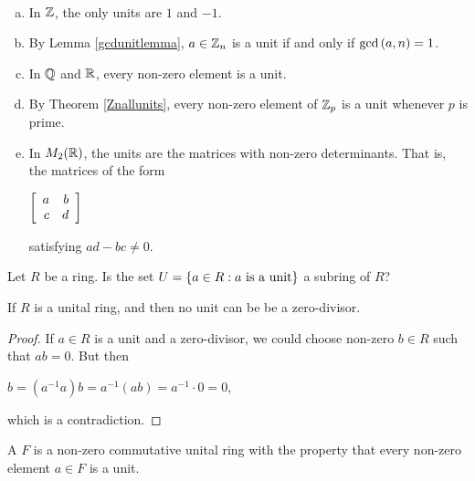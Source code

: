 \documentclass[11pt,fleqn,dvipsnames,usenames]{article}
\begin{document}
%
\begin{examples}~
\begin{enumerate}[(a)]
\item In $\Z$, the only units are $1$ and $-1$.
\item By Lemma \ref{gcdunitlemma}, $a\in \ZN$ is a unit if and only if $\GCD{a,n} = 1$.
\item In $\RATIONAL$ and $\REAL$, every non-zero element is a unit.
\item By Theorem \ref{Znallunits}, every non-zero element of $\Z_p$ is a unit whenever $p$ is prime.
\item In $M_{2}(\REAL)$, the units are the matrices with non-zero determinants.  That is, the matrices of the form
\begin{center}
$\MATRIX{rr}{a & b\\c & d}$
\end{center}
satisfying $ad - bc \neq 0$.
\end{enumerate}
\end{examples}
%
\begin{exercise}
Let $R$ be a ring.  Is the set $U=\SET{a\in R:a\text{ is a unit}}$ a subring of $R$?
\end{exercise}
%
\begin{lemma}\label{unitscantbezerodivisors}
If $R$ is a unital ring, and then no unit can be be a zero-divisor.
\end{lemma}
%
\begin{proof}
If $a\in R$ is a unit and a zero-divisor, we could choose non-zero $b\in R$ such that $ab = 0$.  But then
\begin{center}
$b = (a^{-1}a)b = a^{-1}(ab) = a^{-1}\cdot 0 = 0$,
\end{center}
which is a contradiction.
\end{proof}
%
\begin{definition}
A  $F$ is a non-zero commutative unital ring with the property that every non-zero element $a\in F$ is a unit.
\end{definition}
%
\end{document}
